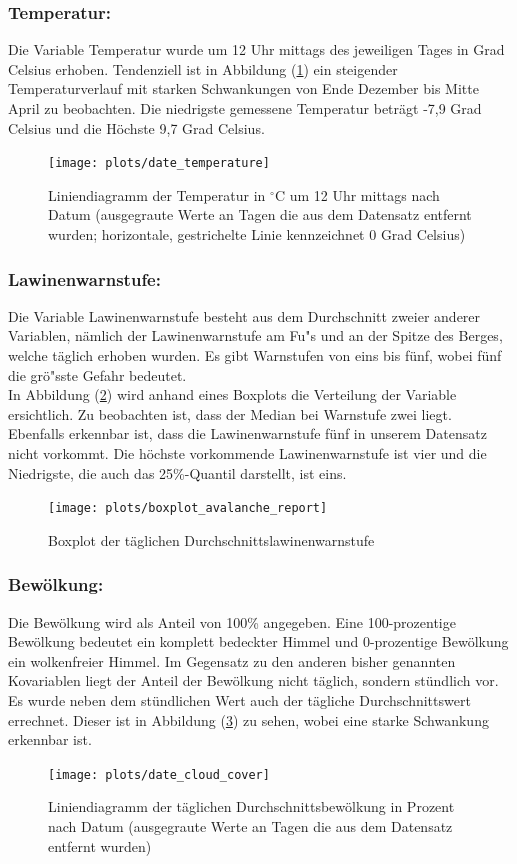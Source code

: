 \documentclass[12pt]{scrreprt}
\begin{document}
\newpage
\subsubsection*{Temperatur:}
Die Variable Temperatur wurde um 12 Uhr mittags des jeweiligen Tages in Grad Celsius erhoben. Tendenziell ist in Abbildung (\ref{pic:date_temperature}) ein steigender Temperaturverlauf mit starken Schwankungen von Ende Dezember bis Mitte April zu beobachten. Die niedrigste gemessene Temperatur beträgt -7,9 Grad Celsius und die Höchste 9,7 Grad Celsius. 
\begin{figure}[H]
	\centering
	\texttt{[image: plots/date\_temperature]}
	\caption{Liniendiagramm der Temperatur in $^\circ$C um 12 Uhr mittags nach Datum (ausgegraute Werte an Tagen die aus dem Datensatz entfernt wurden; horizontale, gestrichelte Linie kennzeichnet 0 Grad Celsius)}
	\label{pic:date_temperature}	
\end{figure}

\newpage
\subsubsection*{Lawinenwarnstufe:}
Die Variable Lawinenwarnstufe besteht aus dem Durchschnitt zweier anderer Variablen, nämlich der Lawinenwarnstufe am Fu"s und an der Spitze des Berges, welche täglich erhoben wurden. Es gibt Warnstufen von eins bis fünf, wobei fünf die grö"sste Gefahr bedeutet. \\
In Abbildung (\ref{pic:boxplot_avalanche_report}) wird anhand eines Boxplots die Verteilung der Variable ersichtlich. Zu beobachten ist, dass der Median bei Warnstufe zwei liegt. Ebenfalls erkennbar ist, dass die Lawinenwarnstufe fünf in unserem Datensatz nicht vorkommt. Die höchste vorkommende Lawinenwarnstufe ist vier und die Niedrigste, die auch das 25\%-Quantil darstellt, ist eins. 
\begin{figure}[H]
	\centering
	\texttt{[image: plots/boxplot\_avalanche\_report]}
	\caption{Boxplot der täglichen Durchschnittslawinenwarnstufe}
	\label{pic:boxplot_avalanche_report}	
\end{figure}

\newpage
\subsubsection*{Bewölkung:}
Die Bewölkung wird als Anteil von 100\% angegeben. Eine 100-prozentige Bewölkung bedeutet ein komplett bedeckter Himmel und 0-prozentige Bewölkung ein wolkenfreier Himmel. Im Gegensatz zu den anderen bisher genannten Kovariablen liegt der Anteil der Bewölkung nicht täglich, sondern stündlich vor. \\
Es wurde neben dem stündlichen Wert auch der tägliche Durchschnittswert errechnet. Dieser ist in Abbildung (\ref{pic:date_cloud_cover}) zu sehen, wobei eine starke Schwankung erkennbar ist.
\begin{figure}[H]
	\centering
	\texttt{[image: plots/date\_cloud\_cover]}
	\caption{Liniendiagramm der täglichen Durchschnittsbewölkung in Prozent nach Datum (ausgegraute Werte an Tagen die aus dem Datensatz entfernt wurden)}
	\label{pic:date_cloud_cover}	
\end{figure}
\end{document}
